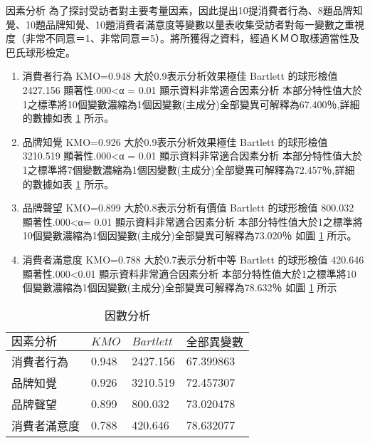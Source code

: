 因素分析
為了探討受訪者對主要考量因素，因此提出10提消費者行為、8題品牌知覺、10題品牌知覺、10題消費者滿意度等變數以量表收集受訪者對每一變數之重視度（非常不同意＝1、非常同意＝5）。將所獲得之資料，經過ＫＭＯ取樣適當性及巴氏球形檢定。
\begin{enumerate}
\item 消費者行為
KMO=0.948 大於0.9表示分析效果極佳 Bartlett 的球形檢值 2427.156 顯著性.000<α = 0.01 顯示資料非常適合因素分析  本部分特性值大於1之標準將10個變數濃縮為1個因變數(主成分)全部變異可解釋為67.400％,詳細的數據如表  \ref{tab:p4} 所示。
\item 品牌知覺
KMO=0.926 大於0.9表示分析效果極佳 Bartlett 的球形檢值 3210.519 顯著性.000<α = 0.01 顯示資料非常適合因素分析  本部分特性值大於1之標準將7個變數濃縮為1個因變數(主成分)全部變異可解釋為72.457％,詳細的數據如表  \ref{tab:p4} 所示。
\item 品牌聲望
KMO=0.899 大於0.8表示分析有價值 Bartlett 的球形檢值 800.032 顯著性.000<α= 0.01 顯示資料非常適合因素分析  本部分特性值大於1之標準將10個變數濃縮為1個因變數(主成分)全部變異可解釋為73.020％ 如圖 \ref{tab:p4}  所示。
\item 消費者滿意度
KMO=0.788 大於0.7表示分析中等 Bartlett 的球形檢值 420.646 顯著性.000<0.01 顯示資料非常適合因素分析  本部分特性值大於1之標準將10個變數濃縮為1個因變數(主成分)全部變異可解釋為78.632％ 如圖 \ref{tab:p4} 所示
\end{enumerate}

\begin{table}[htb]
\caption{因數分析}
\label{tab:p4}
\renewcommand{\arraystretch}{1.2} %
\arrayrulewidth=1pt               %
\tabcolsep=18pt                   %
\begin{tabular}[t]{llll}  %
\hline
 $因素分析$& $KMO$ & $Bartlett$& $全部異變數$ \\
\hline
消費者行為&0.948&2427.156&67.399863\\
 品牌知覺&0.926&3210.519&72.457307  \\
 品牌聲望&0.899&800.032&73.020478  \\
消費者滿意度&0.788&420.646&78.632077  \\
\hline
\end{tabular}
\end{table}


